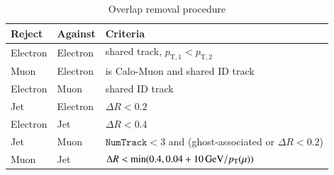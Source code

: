 \begin{table}[ht]
\caption{Overlap removal procedure}
\label{table:overlap_removal}
 \centering
  \begin{tabular}{lll}
    \toprule
    Reject & Against & Criteria \\
    \midrule
    Electron & Electron & shared track, \(p_{\text{T},1} < p_{\text{T},2}\) \\
    Muon     & Electron & is Calo-Muon and shared ID track \\
    Electron & Muon     & shared ID track \\
    Jet      & Electron & \(\Delta R < 0.2\)\\
    Electron & Jet      & \(\Delta R < 0.4\)  \\
    Jet      & Muon     & \(\texttt{NumTrack} < 3\) and (ghost-associated or \(\Delta R < 0.2\))  \\
    Muon     & Jet      &  \(\Delta R < \min(0.4, 0.04 + \SI{10}{\ensuremath{\text{GeV}}}/p_{\text{T}}(\mu))\) \\
    \bottomrule
  \end{tabular}
\end{table}


